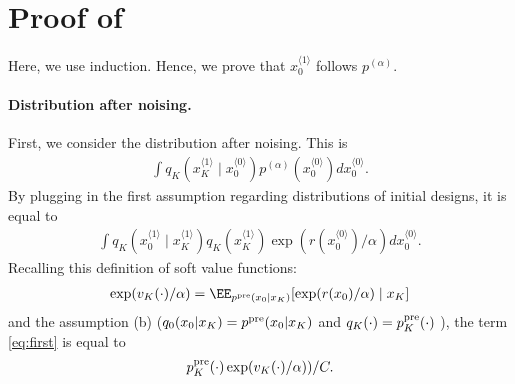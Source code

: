 \onecolumn 
\appendix 


\section{Proof of } \label{sec:proof}

Here, we use induction. Hence, we prove that $x^{\langle 1 \rangle}_0$ follows $p^{(\alpha)}$. 

\paragraph{Distribution after noising.} First, we consider the distribution after noising. This is 
\begin{align*}
    \int q_K(x^{\langle 1 \rangle}_K \mid x^{\langle 0 \rangle}_0)  p^{(\alpha)}(x^{\langle 0 \rangle}_0)d x^{\langle 0 \rangle}_0. 
\end{align*}
By plugging in the first assumption regarding distributions of initial designs, it is equal to  
\begin{align}\label{eq:first}
    \int q_K(x^{\langle 1 \rangle}_0 \mid x^{\langle 1 \rangle}_K)q_K(x^{\langle 1 \rangle}_K)\exp(r(x^{\langle 0 \rangle}_0)/\alpha) d x^{\langle 0 \rangle}_0.  
\end{align}
Recalling this definition of soft value functions:
\begin{align*}
    \exp(v_K(\cdot)/\alpha)=\EE_{p^{\pre}(x_0|x_K)}[\exp(r(x_0)/\alpha)\mid x_K] 
\end{align*}
and the assumption (b) ($q_0(x_0|x_K) = p^{\mathrm{pre}}(x_0|x_K)$ and $q_K(\cdot)=p^{\mathrm{pre}}_K(\cdot)$ ), the term \eqref{eq:first} is equal to 
\begin{align*}
    p^{\mathrm{pre}}_K(\cdot)\exp(v_K(\cdot)/\alpha))/C. 
\end{align*}

